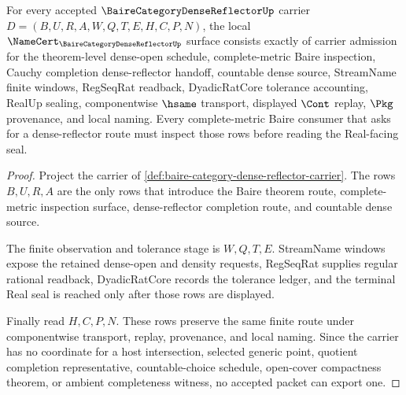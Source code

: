\begin{theorem}
\label{thm:baire-category-dense-reflector-namecert-obligations}
For every accepted $\BaireCategoryDenseReflectorUp$ carrier $D=(B,U,R,A,W,Q,T,E,H,C,P,N)$, the local $\NameCert_{\BaireCategoryDenseReflectorUp}$ surface consists exactly of carrier admission for the theorem-level dense-open schedule, complete-metric Baire inspection, Cauchy completion dense-reflector handoff, countable dense source, StreamName finite windows, RegSeqRat readback, DyadicRatCore tolerance accounting, RealUp sealing, componentwise $\hsame$ transport, displayed $\Cont$ replay, $\Pkg$ provenance, and local naming. Every complete-metric Baire consumer that asks for a dense-reflector route must inspect those rows before reading the Real-facing seal.
\end{theorem}
\begin{proof}
Project the carrier of \autoref{def:baire-category-dense-reflector-carrier}. The rows $B,U,R,A$ are the only rows that introduce the Baire theorem route, complete-metric inspection surface, dense-reflector completion route, and countable dense source.

The finite observation and tolerance stage is $W,Q,T,E$. StreamName windows expose the retained dense-open and density requests, RegSeqRat supplies regular rational readback, DyadicRatCore records the tolerance ledger, and the terminal Real seal is reached only after those rows are displayed.

Finally read $H,C,P,N$. These rows preserve the same finite route under componentwise transport, replay, provenance, and local naming. Since the carrier has no coordinate for a host intersection, selected generic point, quotient completion representative, countable-choice schedule, open-cover compactness theorem, or ambient completeness witness, no accepted packet can export one.
\end{proof}


